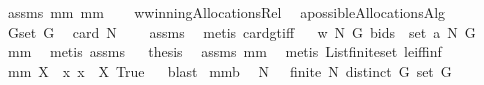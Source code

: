\begin{isabellebody}
%
\isadelimproof
%
\endisadelimproof
%
\isatagproof
{}\isamarkupfalse%
\ assms\ mm{}{}\ mm{}{}\ \isanewline
{}\isamarkupfalse%
\ {\isacharminus}\isanewline
{}\isamarkupfalse%
\ {\isacharquery}w{\isacharequal}winningAllocationsRel\ \isamarkupfalse%
\ {\isacharquery}a{\isacharequal}possibleAllocationsAlg{}\isanewline
{}\isamarkupfalse%
\ {\isacharquery}G{\isacharequal}{\isachardoublequoteopen}set\ G{\isachardoublequoteclose}\ \isamarkupfalse%
\ {\isachardoublequoteopen}card\ N\ {\isachargreater}\ {}{\isachardoublequoteclose}\ \isamarkupfalse%
\ assms\ \isamarkupfalse%
\ {\isacharparenleft}metis\ card{\isacharunderscore}gt{\isacharunderscore}{}{\isacharunderscore}iff{\isacharparenright}\isanewline
{}\isamarkupfalse%
\ \isamarkupfalse%
\ {\isachardoublequoteopen}{\isacharquery}w\ N\ {\isacharquery}G\ bids\ {\isasymsubseteq}\ set\ {\isacharparenleft}{\isacharquery}a\ N\ G{\isacharparenright}{\isachardoublequoteclose}\ \isamarkupfalse%
\ mm{}{}\ \isamarkupfalse%
\ {\isacharparenleft}metis\ assms{\isacharparenleft}{}{\isacharparenright}{\isacharparenright}\isanewline
{}\isamarkupfalse%
\ \isamarkupfalse%
\ {\isacharquery}thesis\ \isamarkupfalse%
\ assms\ mm{}{}\ \isamarkupfalse%
\ {\isacharparenleft}metis\ List{\isachardot}finite{\isacharunderscore}set\ le{\isacharunderscore}iff{\isacharunderscore}inf{\isacharparenright}\isanewline
{}\isamarkupfalse%
%
\endisatagproof
{\isafoldproof}%
%
\isadelimproof
\isanewline
%
\endisadelimproof
{}\isamarkupfalse%
\ mm{}{}{\isacharcolon}\ {\isachardoublequoteopen}X\ {\isacharequal}\ {\isacharparenleft}{\isacharpercent}x{\isachardot}\ x\ {\isasymin}\ X{\isacharparenright}\ {\isacharminus}{\isacharbackquote}{\isacharbraceleft}True{\isacharbraceright}{\isachardoublequoteclose}%
\isadelimproof
\ %
\endisadelimproof
%
\isatagproof
{}\isamarkupfalse%
\ blast%
\endisatagproof
{\isafoldproof}%
%
\isadelimproof
%
\endisadelimproof
\isanewline
{}\isamarkupfalse%
\ mm{}{}b{\isacharcolon}\ \ \isanewline
{\isachardoublequoteopen}N\ {\isasymnoteq}\ {\isacharbraceleft}{\isacharbraceright}{\isachardoublequoteclose}\ {\isachardoublequoteopen}finite\ N{\isachardoublequoteclose}\ {\isachardoublequoteopen}distinct\ G{\isachardoublequoteclose}\ {\isachardoublequoteopen}set\ G\ {\isasymnoteq}\ {\isacharbraceleft}{\isacharbraceright}{\isachardoublequoteclose}\ \isanewline

\end{isabellebody}
